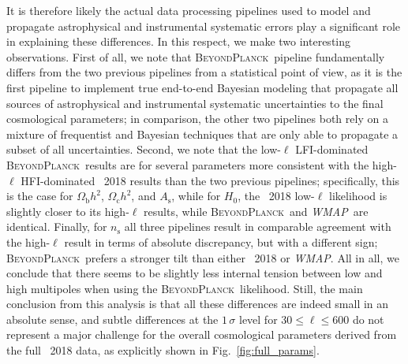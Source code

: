 \documentclass[twocolumn]{aa}
\def\WMAP{\textit{WMAP}}
\newcommand{\BP}{\textsc{BeyondPlanck}}
\begin{document}
It is therefore likely the actual data processing pipelines used to
model and propagate astrophysical and instrumental systematic errors
play a significant role in explaining these differences. In this
respect, we make two interesting observations. First of all, we note
that \BP\ pipeline fundamentally differs from the two previous
pipelines from a statistical point of view, as it is the first
pipeline to implement true end-to-end Bayesian modeling that
propagate all sources of astrophysical and instrumental systematic
uncertainties to the final cosmological parameters; in comparison, the
other two pipelines both rely on a mixture of frequentist and Bayesian
techniques that are only able to propagate a subset of all
uncertainties. Second, we note that the low-$\ell$ LFI-dominated
\BP\ results are for several parameters more consistent with the
high-$\ell$ HFI-dominated \Planck\ 2018 results than the two previous
pipelines; specifically, this is the case for $\Omega_\mathrm{b}h^2$,
$\Omega_\mathrm{c}h^2$, and $A_{\mathrm{s}}$, while for $H_0$, the
\Planck\ 2018 low-$\ell$ likelihood is slightly closer to its
high-$\ell$ results, while \BP\ and \WMAP\ are identical. Finally, for
$n_\mathrm{s}$ all three pipelines result in comparable agreement with
the high-$\ell$ result in terms of absolute discrepancy, but with a
different sign; \BP\ prefers a stronger tilt than either \Planck\ 2018
or \WMAP. All in all, we conclude that there seems to be slightly less
internal tension between low and high multipoles when using the
\BP\ likelihood. Still, the main conclusion from this analysis is that
all these differences are indeed small in an absolute sense, and
subtle differences at the $1\,\sigma$ level for $30\le\ell\le 600$ do
not represent a major challenge for the overall cosmological
parameters derived from the full \Planck\ 2018 data, as explicitly
shown in Fig.~\ref{fig:full_params}.
\end{document}
